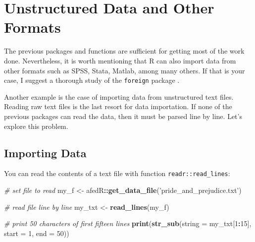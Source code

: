 \documentclass[
  12pt,
]{book}
\newenvironment{Shaded}{\begin{snugshade}}{\end{snugshade}}
\newcommand{\CommentTok}[1]{\textcolor[rgb]{0.37,0.37,0.37}{\textit{#1}}}
\newcommand{\DataTypeTok}[1]{\textcolor[rgb]{0.27,0.27,0.27}{#1}}
\newcommand{\DecValTok}[1]{\textcolor[rgb]{0.06,0.06,0.06}{#1}}
\newcommand{\KeywordTok}[1]{\textcolor[rgb]{0.27,0.27,0.27}{\textbf{#1}}}
\newcommand{\NormalTok}[1]{#1}
\newcommand{\OperatorTok}[1]{\textcolor[rgb]{0.43,0.43,0.43}{\textbf{#1}}}
\newcommand{\StringTok}[1]{\textcolor[rgb]{0.5,0.5,0.5}{#1}}
\begin{document}
\hypertarget{unstructured-data-and-other-formats}{%
\section{Unstructured Data and Other Formats}\label{unstructured-data-and-other-formats}}

The previous packages and functions are sufficient for getting most of the work done. Nevertheless, it is worth mentioning that R can also import data from other formats such as SPSS, Stata, Matlab, among many others. If that is your case, I suggest a thorough study of the \texttt{foreign} package \citep{R-foreign}.

Another example is the case of importing data from unstructured text files. Reading raw text files is the last resort for data importation. If none of the previous packages can read the data, then it must be parsed line by line. Let's explore this problem.

\hypertarget{importing-data-5}{%
\subsection{Importing Data}\label{importing-data-5}}

You can read the contents of a text file with function \texttt{readr::read\_lines}: 

\begin{Shaded}
\begin{Highlighting}[]
\CommentTok{# set file to read}
\NormalTok{my_f <-}\StringTok{ }\NormalTok{afedR}\OperatorTok{::}\KeywordTok{get_data_file}\NormalTok{(}\StringTok{'pride_and_prejudice.txt'}\NormalTok{)}

\CommentTok{# read file line by line}
\NormalTok{my_txt <-}\StringTok{ }\KeywordTok{read_lines}\NormalTok{(my_f)}

\CommentTok{# print 50 characters of first fifteen lines}
\KeywordTok{print}\NormalTok{(}\KeywordTok{str_sub}\NormalTok{(}\DataTypeTok{string =}\NormalTok{ my_txt[}\DecValTok{1}\OperatorTok{:}\DecValTok{15}\NormalTok{], }
              \DataTypeTok{start =} \DecValTok{1}\NormalTok{, }
              \DataTypeTok{end =} \DecValTok{50}\NormalTok{))}
\end{Highlighting}
\end{Shaded}
\end{document}
